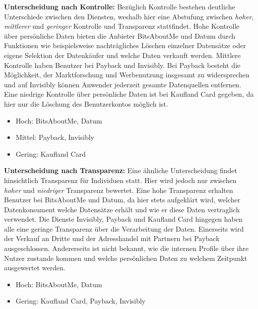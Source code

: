 \noindent \textbf{Unterscheidung nach Kontrolle:} Bezüglich Kontrolle bestehen deutliche Unterschiede zwischen den Diensten, weshalb hier eine Abstufung zwischen \textit{hoher}, \textit{mittlerer} und \textit{geringer} Kontrolle und Transparenz stattfindet. Hohe Kontrolle über persönliche Daten bieten die Anbieter BitsAboutMe und Datum durch Funktionen wie beispielsweise nachträgliches Löschen einzelner Datensätze oder eigene Selektion der Datenkäufer und welche Daten verkauft werden. Mittlere Kontrolle haben Benutzer bei Payback und Invisibly. Bei Payback besteht die Möglichkeit, der Marktforschung und Werbenutzung insgesamt zu widersprechen und auf Invisibly können Anwender jederzeit gesamte Datenquellen entfernen. Eine niedrige Kontrolle über persönliche Daten ist bei Kaufland Card gegeben, da hier nur die Löschung des Benutzerkontos möglich ist.
\begin{itemize}
    \item Hoch: BitsAboutMe, Datum
    \item Mittel: Payback, Invisibly
    \item Gering: Kaufland Card
\end{itemize}

\noindent \textbf{Unterscheidung nach Transparenz:} Eine ähnliche Unterscheidung findet hinsichtlich Transparenz für Individuen statt. Hier wird jedoch nur zwischen \textit{hoher} und \textit{niedriger} Transparenz bewertet. Eine hohe Transparenz erhalten Benutzer bei BitsAboutMe und Datum, da hier stets aufgeklärt wird, welcher Datenkonsument welche Datensätze erhält und wie er diese Daten vertraglich verwendet. Die Dienste Invisibly, Payback und Kaufland Card hingegen haben alle eine geringe Transparenz über die Verarbeitung der Daten. Einerseits wird der Verkauf an Dritte und der Adresshandel mit Partnern bei Payback ausgeschlossen. Andererseits ist nicht bekannt, wie die internen Profile über ihre Nutzer zustande kommen und welche persönlichen Daten zu welchem Zeitpunkt ausgewertet werden.
\begin{itemize}
    \item Hoch: BitsAboutMe, Datum
    \item Gering: Kaufland Card, Payback, Invisibly
\end{itemize}